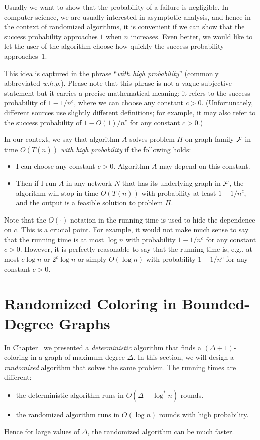 Usually we want to show that the probability of a failure is negligible. In computer science, we are usually interested in asymptotic analysis, and hence in the context of randomized algorithms, it is convenient if we can show that the success probability approaches $1$ when $n$ increases. Even better, we would like to let the user of the algorithm choose how quickly the success probability approaches~$1$.

This idea is captured in the phrase ``\emph{with high probability}'' (commonly abbreviated \emph{w.h.p.}). Please note that this phrase is not a vague subjective statement but it carries a precise mathematical meaning: it refers to the success probability of $1 - 1/n^c$, where we can choose any constant $c > 0$. (Unfortunately, different sources use slightly different definitions; for example, it may also refer to the success probability of $1 - O(1)/n^c$ for any constant $c > 0$.)

In our context, we say that algorithm $A$ solves problem $\Pi$ on graph family $\mathcal{F}$ in time $O(T(n))$ \emph{with high probability} if the following holds:
\begin{itemize}
    \item I can choose any constant $c > 0$. Algorithm $A$ may depend on this constant.
    \item Then if I run $A$ in any network $N$ that has its underlying graph in $\mathcal{F}$, the algorithm will stop in time $O(T(n))$ with probability at least $1 - 1/n^c$, and the output is a feasible solution to problem $\Pi$.
\end{itemize}
Note that the $O(\cdot)$ notation in the running time is used to hide the dependence on $c$. This is a crucial point. For example, it would not make much sense to say that the running time is at most $\log n$ with probability $1 - 1/n^c$ for any constant $c > 0$. However, it is perfectly reasonable to say that the running time is, e.g., at most $c \log n$ or $2^c \log n$ or simply $O(\log n)$ with probability $1 - 1/n^c$ for any constant $c > 0$.


\section{Randomized Coloring in Bounded-Degree Graphs}\label{sec:bdrand}

In Chapter~ we presented a \emph{deterministic} algorithm that finds a ${(\Delta+1)}$-coloring in a graph of maximum degree $\Delta$. In this section, we will design a \emph{randomized} algorithm that solves the same problem. The running times are different:
\begin{itemize}[noitemsep]
    \item the deterministic algorithm runs in $O(\Delta + \log^* n)$ rounds.
    \item the randomized algorithm runs in $O(\log n)$ rounds with high probability.
\end{itemize}
Hence for large values of $\Delta$, the randomized algorithm can be much faster.

